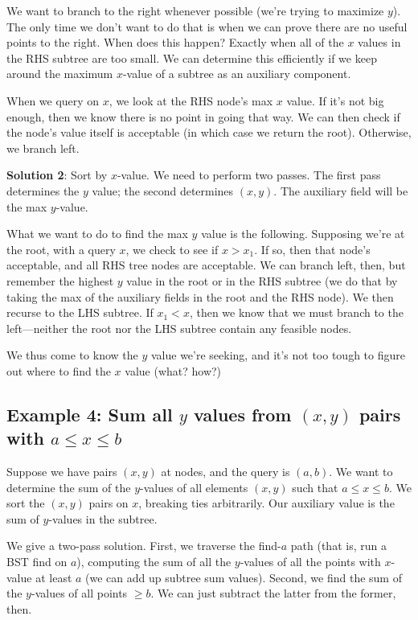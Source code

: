 \documentclass{article}
\begin{document}
We want to branch to the right whenever possible (we're trying to maximize $y$).
The only time we don't want to do that is when we can prove there are no
useful points to the right. When does this happen? Exactly when all of the
$x$ values in the RHS subtree are too small.
We can determine this efficiently if we keep around the maximum $x$-value 
of a subtree as an auxiliary component.

When we query on $x$, we look at the RHS node's max $x$ value. If it's
not big enough, then we know there is no point in going that way.
We can then check if the node's value itself is acceptable (in which case
we return the root).
Otherwise, we branch left.



\textbf{Solution 2}: Sort by $x$-value.
We need to perform two passes.
The first pass determines the $y$ value; the second determines $(x,y)$.
The auxiliary field will be the max $y$-value.

What we want to do to find the max $y$ value is the following.
Supposing we're at the root, with a query $x$,
we check to see if $x > x_1$.
If so, then that node's acceptable, and all RHS tree nodes are acceptable.
We can branch left, then, but remember the highest $y$ value in the root
or in the RHS subtree (we do that by taking the max of the auxiliary fields
in the root and the RHS node).
We then recurse to the LHS subtree.
If $x_1 < x$, then we know that we must branch to the left---neither the
root nor the LHS subtree contain any feasible nodes.

We thus come to know the $y$ value we're seeking, and it's not too tough
to figure out where to find the $x$ value (what? how?)



\subsection{Example 4: Sum all $y$ values from $(x,y)$ pairs with 
		    $a\leq x \leq b$}

Suppose we have pairs $(x,y)$ at nodes, and the query is $(a,b)$.
We want to determine the sum of the $y$-values of all elements $(x,y)$
such that $a \leq x \leq b$.
We sort the $(x,y)$ pairs on $x$, breaking ties arbitrarily.
Our auxiliary value is the sum of $y$-values in the subtree.

We give a two-pass solution.
First, we traverse the find-$a$ path (that is, run a BST find on $a$), 
computing the sum of all the
$y$-values of all the points with $x$-value at least $a$ (we can
add up subtree sum values).
Second, we find the sum of the $y$-values of all points $\geq b$.
We can just subtract the latter from the former, then.
\end{document}
